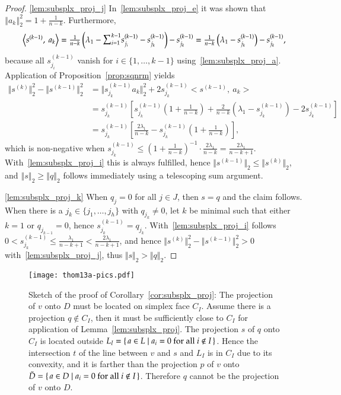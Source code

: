 \documentclass[twoside,11pt]{article}
\newcommand{\0}{\mathcal{O}}
\newcommand{\norm}[1]{\left\Vert#1\right\Vert}
\newcommand{\bnorm}[1]{\big\Vert#1\big\Vert}
\newcommand{\bscp}[2]{\big<#1,\ #2\big>}
\newcommand{\discint}[2]{\{#1,\dotsc,#2\}}
\newcommand{\inint}[2]{\in\discint{#1}{#2}}
\newcommand{\smallsum}{\scalebox{1.2}{$\sum$}}
\begin{document}
\begin{proof}
\ref{lem:subsplx_proj_j}
In~\ref{lem:subsplx_proj_e} it was shown that $\norm{a_k}_2^2 = 1 + \tfrac{1}{n - k}$.
Furthermore,
\begin{displaymath}
  \bscp{s^{(k-1)}}{a_k}
  = \tfrac{1}{n - k}\left(\lambda_1 - \smallsum_{i=1}^{k-1}s^{(k-1)}_{j_i} - s^{(k-1)}_{j_k}\right) - s^{(k-1)}_{j_k}
  = \tfrac{1}{n - k}\left(\lambda_1 - s^{(k-1)}_{j_k}\right) - s^{(k-1)}_{j_k}\text{,}
\end{displaymath}
because all $s^{(k-1)}_{j_i}$ vanish for $i\inint{1}{k-1}$ using~\ref{lem:subsplx_proj_a}.
Application of Proposition~\ref{prop:sqnrm} yields
\begin{align*}
  \bnorm{s^{(k)}}_2^2 - \bnorm{s^{(k-1)}}_2^2
  &= \bnorm{s^{(k-1)}_{j_k}a_k}_2^2 + 2s^{(k-1)}_{j_k}\bscp{s^{(k-1)}}{a_k}\\
  &= s^{(k-1)}_{j_k}\left[s^{(k-1)}_{j_k}\left(1 + \tfrac{1}{n - k}\right) + \tfrac{2}{n-k}\left(\lambda_1 - s^{(k-1)}_{j_k}\right) - 2s^{(k-1)}_{j_k}\right]\\
  &= s^{(k-1)}_{j_k}\left[\tfrac{2\lambda_1}{n - k} - s^{(k-1)}_{j_k}\left(1 + \tfrac{1}{n - k}\right)\right]\text{,}
\end{align*}
which is non-negative when $s^{(k-1)}_{j_k} \leq \left(1 + \tfrac{1}{n - k}\right)^{-1}\cdot\tfrac{2\lambda_1}{n - k} = \tfrac{2\lambda_1}{n - k + 1}$.
With~\ref{lem:subsplx_proj_i} this is always fulfilled, hence $\bnorm{s^{(k-1)}}_2 \leq \bnorm{s^{(k)}}_2$, and $\norm{s}_2 \geq \norm{q}_2$ follows immediately using a telescoping sum argument.

\ref{lem:subsplx_proj_k}
When $q_j = 0$ for all $j\in J$, then $s = q$ and the claim follows.
When there is a $j_k\inint{j_1}{j_h}$ with $q_{j_k}\neq 0$, let $k$ be minimal such that either $k = 1$ or $q_{j_{k-1}} = 0$, hence $s^{(k-1)}_{j_k} = q_{j_k}$.
With~\ref{lem:subsplx_proj_i} follows $0 < s^{(k-1)}_{j_k}  \leq \tfrac{\lambda_1}{n - k + 1} < \tfrac{2\lambda_1}{n - k + 1}$, and hence $\bnorm{s^{(k)}}_2^2 - \bnorm{s^{(k-1)}}_2^2 > 0$ with~\ref{lem:subsplx_proj_j}, thus $\bnorm{s}_2 > \bnorm{q}_2$.
\end{proof}
\begin{figure}[t]
  \centering
  \texttt{[image: thom13a-pics.pdf]}
  \caption{Sketch of the proof of Corollary~\ref{cor:subsplx_proj}: The projection of $v$ onto $D$ must be located on simplex face $C_I$. Assume there is a projection $q\not\in C_I$, then it must be sufficiently close to $C_I$ for application of Lemma~\ref{lem:subsplx_proj}. The projection $s$ of $q$ onto $C_I$ is located outside $L_I = \set{a\in L|a_i = 0\text{ for all }i\not\in I}$. Hence the intersection $t$ of the line between $v$ and $s$ and $L_I$ is in $C_I$ due to its convexity, and it is farther than the projection $p$ of $v$ onto $\tilde{D} = \set{a\in D|a_i = 0\text{ for all }i\not\in I}$. Therefore $q$ cannot be the projection of $v$ onto $D$.}
  \label{fig:simplexface_corr}
\end{figure}
\end{document}

